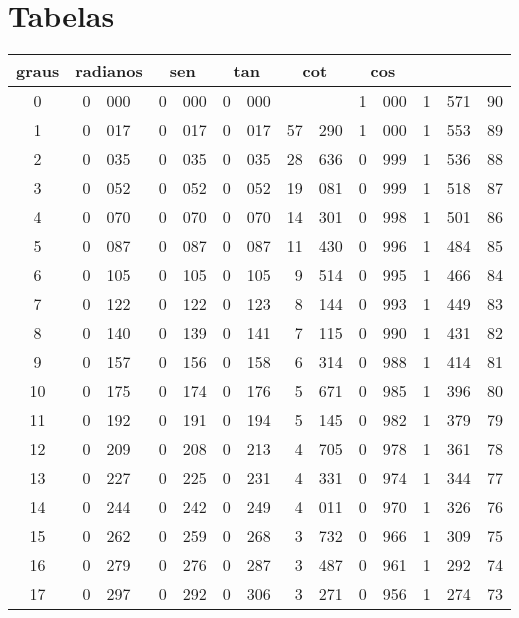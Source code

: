 \chapter{Tabelas}


\begingroup
\setlength{\tabcolsep}{0.7em}

\begin{tabular}{c|r@{,}l|r@{,}l r@{,}l r@{,}l r@{,}l|r@{,}l|c}
  \hline
  graus & \multicolumn{2}{c|}{radianos} & \multicolumn{2}{c}{sen} & \multicolumn{2}{c}{tan} & \multicolumn{2}{c}{cot} & \multicolumn{2}{c|}{cos} & \multicolumn{2}{c|}{ } & \\
  \hline
   0 & 0&000 & 0&000 & 0&000 & \multicolumn{2}{c}{ } & 1&000 & 1&571 & 90 \\
   1 & 0&017 & 0&017 & 0&017 & 57&290 & 1&000 & 1&553 & 89 \\
   2 & 0&035 & 0&035 & 0&035 & 28&636 & 0&999 & 1&536 & 88 \\
   3 & 0&052 & 0&052 & 0&052 & 19&081 & 0&999 & 1&518 & 87 \\
   4 & 0&070 & 0&070 & 0&070 & 14&301 & 0&998 & 1&501 & 86 \\
   5 & 0&087 & 0&087 & 0&087 & 11&430 & 0&996 & 1&484 & 85 \\
   6 & 0&105 & 0&105 & 0&105 & 9&514 & 0&995 & 1&466 & 84 \\
   7 & 0&122 & 0&122 & 0&123 & 8&144 & 0&993 & 1&449 & 83 \\
   8 & 0&140 & 0&139 & 0&141 & 7&115 & 0&990 & 1&431 & 82 \\
   9 & 0&157 & 0&156 & 0&158 & 6&314 & 0&988 & 1&414 & 81 \\
  10 & 0&175 & 0&174 & 0&176 & 5&671 & 0&985 & 1&396 & 80 \\
  11 & 0&192 & 0&191 & 0&194 & 5&145 & 0&982 & 1&379 & 79 \\
  12 & 0&209 & 0&208 & 0&213 & 4&705 & 0&978 & 1&361 & 78 \\
  13 & 0&227 & 0&225 & 0&231 & 4&331 & 0&974 & 1&344 & 77 \\
  14 & 0&244 & 0&242 & 0&249 & 4&011 & 0&970 & 1&326 & 76 \\
  15 & 0&262 & 0&259 & 0&268 & 3&732 & 0&966 & 1&309 & 75 \\
  16 & 0&279 & 0&276 & 0&287 & 3&487 & 0&961 & 1&292 & 74 \\
  17 & 0&297 & 0&292 & 0&306 & 3&271 & 0&956 & 1&274 & 73 \\

\end{tabular}
